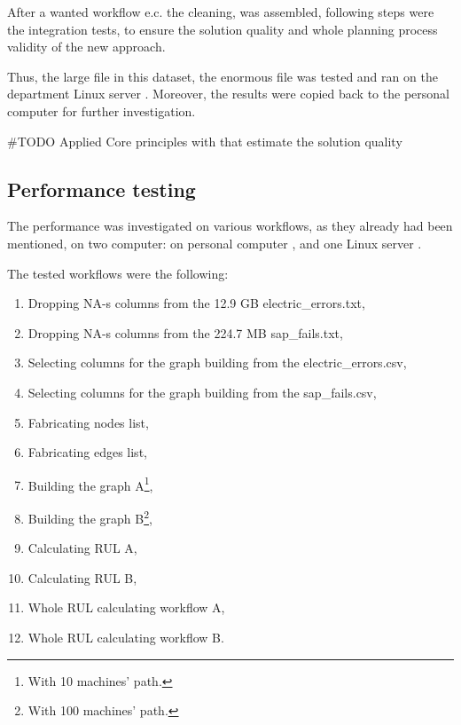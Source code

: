 After a wanted workflow e.c. the cleaning, was assembled, following steps were the integration tests, to ensure the solution quality and whole planning process validity of the new approach.

Thus, the large file in this dataset, the enormous file was tested and ran on the department Linux server \cite{Batman}.
Moreover, the results were copied back to the personal computer for further investigation.

\#TODO Applied Core principles with that estimate the solution quality
\subsection{Performance testing}
The performance was investigated on various workflows, as they already had been mentioned, on two computer: on personal computer \cite{Latitude}, and one Linux server \cite{Batman}.

The tested workflows were the following:
\begin{enumerate}
	\item{Dropping NA-s columns from the 12.9 GB electric\_errors.txt,}
	\item{Dropping NA-s columns from the 224.7 MB sap\_fails.txt,}
	\item{Selecting columns for the graph building from the electric\_errors.csv,}
	\item{Selecting columns for the graph building from the sap\_fails.csv,}
	\item{Fabricating nodes list,}
	\item{Fabricating edges list,}
	\item{Building the graph A\footnote{With 10 machines' path.},}
	\item{Building the graph B\footnote{With 100 machines' path.},}
	\item{Calculating RUL A,}
	\item{Calculating RUL B,}
	\item{Whole RUL calculating workflow A,}
	\item{Whole RUL calculating workflow B.}
\end{enumerate} 

